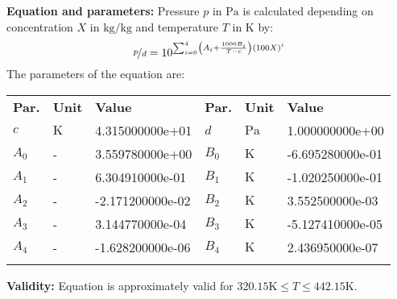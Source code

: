 \textbf{Equation and parameters:}
\newline
%
Pressure $p$ in $\si{\pascal}$ is calculated depending on concentration $X$ in $\si{\kilogram\per\kilogram}$ and  temperature $T$ in $\si{\kelvin}$ by:
%
\begin{equation*}
\nicefrac{p}{d} = 10 ^ { \sum_{i=0}^{4} \left( A_i + \frac{1000 B_i}{T - c} \right) \left( 100 X \right) ^{i}}
\end{equation*}
%
The parameters of the equation are:
%
\begin{longtable}[l]{lll|lll}
\toprule
\addlinespace
\textbf{Par.} & \textbf{Unit} & \textbf{Value} &	\textbf{Par.} & \textbf{Unit} & \textbf{Value} \\
\addlinespace
\midrule
\endhead

\bottomrule
\endfoot
\bottomrule
\endlastfoot
\addlinespace

$c$ & $\si{\kelvin}$ & 4.315000000e+01 & $d$ & $\si{\pascal}$ & 1.000000000e+00 \\
$A_0$ & - & 3.559780000e+00 & $B_0$ & $\si{\kelvin}$ & -6.695280000e-01 \\
$A_1$ & - & 6.304910000e-01 & $B_1$ & $\si{\kelvin}$ & -1.020250000e-01 \\
$A_2$ & - & -2.171200000e-02 & $B_2$ & $\si{\kelvin}$ & 3.552500000e-03 \\
$A_3$ & - & 3.144770000e-04 & $B_3$ & $\si{\kelvin}$ & -5.127410000e-05 \\
$A_4$ & - & -1.628200000e-06 & $B_4$ & $\si{\kelvin}$ & 2.436950000e-07 \\

\addlinespace\end{longtable}

\textbf{Validity:}
\newline
Equation is approximately valid for $320.15 \si{\kelvin} \leq T \leq 442.15 \si{\kelvin}$.
\newline

